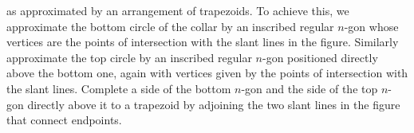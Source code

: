\documentclass[newpage,hints,handout,noauthor,nooutcomes,12pt]{ximera}
\begin{document}
\begin{image}
\end{image}

as approximated by an arrangement of trapezoids. To achieve this, we
approximate the bottom circle of the collar by an inscribed regular $n$-gon
whose vertices are the points of intersection with the slant lines in the
figure. Similarly approximate the top circle by an inscribed regular $n$-gon
positioned directly above the bottom one, again with vertices given by the
points of intersection with the slant lines. Complete a side of the bottom
$n$-gon and the side of the top $n$-gon directly above it to a trapezoid by
adjoining the two slant lines in the figure that connect endpoints.
\end{document}
